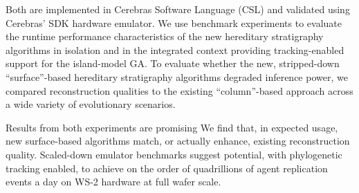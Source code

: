 Both are implemented in Cerebras Software Language (CSL) and validated using Cerebras' SDK hardware emulator.
We use benchmark experiments to evaluate the runtime performance characteristics of the new hereditary stratigraphy algorithms in isolation and in the integrated context providing tracking-enabled support for the island-model GA.
To evaluate whether the new, stripped-down ``surface''-based hereditary stratigraphy algorithms degraded inference power, we compared reconstruction qualities to the existing ``column''-based approach across a wide variety of evolutionary scenarios.

Results from both experiments are promising
We find that, in expected usage, new surface-based algorithms match, or actually enhance, existing reconstruction quality.
Scaled-down emulator benchmarks suggest potential, with phylogenetic tracking enabled, to achieve on the order of quadrillions of agent replication events a day on WS-2 hardware at full wafer scale.



